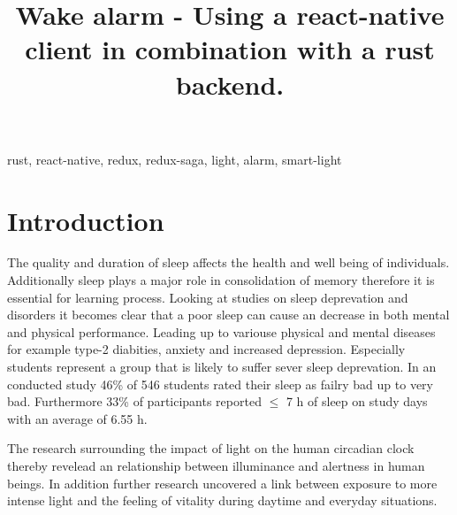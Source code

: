 \documentclass[conference]{IEEEtran}
\begin{document}
\title{Wake alarm - Using a react-native client in combination with a rust backend.}

\author{
\and
{}
}


\maketitle

\begin{abstract}


\end{abstract}

\begin{IEEEkeywords}
rust, react-native, redux, redux-saga, light, alarm, smart-light
\end{IEEEkeywords}

\section{Introduction}
The quality and duration of sleep affects the health and well being of individuals.
Additionally sleep plays a major role in consolidation of memory \cite{Rauchs2005} therefore it is essential for learning process.
Looking at studies on sleep deprevation and disorders it becomes clear that a poor sleep can cause an decrease in both
mental and physical performance. \cite{Mirghani2015a, Antunes2017a} Leading up to variouse physical and mental
diseases for example type-2 diabities, anxiety and increased depression. Especially students represent a group that 
is likely to suffer sever sleep deprevation. In an conducted study 46\% of 546 students rated their sleep as failry bad up to 
very bad. Furthermore 33\% of participants reported $\leq$ 7 h of sleep on study days with an average of 6.55 h. \cite{Norbury2019a}

The research surrounding the impact of light on the human circadian clock thereby revelead an relationship between illuminance and
alertness in human beings. \cite{DuffyJeanne2009a} In addition further research uncovered a link between exposure to more intense
light and the feeling of vitality during daytime and everyday situations. \cite{Smolders2014a}
\end{document}
